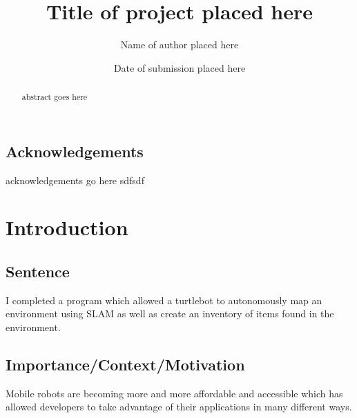 \documentclass{mproj}
\begin{document}
\title{Title of project placed here}
\author{Name of author placed here}
\date{Date of submission placed here}
\maketitle

\begin{abstract}
abstract goes here
\end{abstract}

\educationalconsent


\newpage
\section*{Acknowledgements}

acknowledgements go here sdfsdf

\tableofcontents

\chapter{Introduction}\label{intro}

\section{Sentence}

I completed a program which allowed a turtlebot to autonomously map an environment using SLAM as well as create an inventory of items found in the environment.


\section{Importance/Context/Motivation}

Mobile robots are becoming more and more affordable and accessible which has allowed developers to take advantage of their applications in many different ways. 
\end{document}
